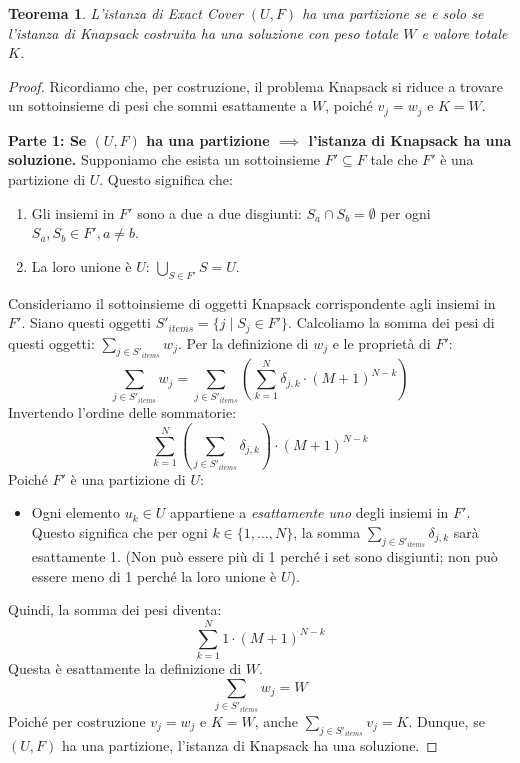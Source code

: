 \documentclass[a4paper, 11pt]{book} %
\newtheorem{theorem}{Teorema}[section]
\theoremstyle{definition}
\begin{document}
\begin{theorem}
L'istanza di Exact Cover $(U, F)$ ha una partizione se e solo se l'istanza di Knapsack costruita ha una soluzione con peso totale $W$ e valore totale $K$.
\end{theorem}
\begin{proof}
Ricordiamo che, per costruzione, il problema Knapsack si riduce a trovare un sottoinsieme di pesi che sommi esattamente a $W$, poiché $v_j=w_j$ e $K=W$.

\textbf{Parte 1: Se $(U, F)$ ha una partizione $\implies$ l'istanza di Knapsack ha una soluzione.}
Supponiamo che esista un sottoinsieme $F' \subseteq F$ tale che $F'$ è una partizione di $U$. Questo significa che:
\begin{enumerate}
    \item Gli insiemi in $F'$ sono a due a due disgiunti: $S_a \cap S_b = \emptyset$ per ogni $S_a, S_b \in F', a \neq b$.
    \item La loro unione è $U$: $\bigcup_{S \in F'} S = U$.
\end{enumerate}
Consideriamo il sottoinsieme di oggetti Knapsack corrispondente agli insiemi in $F'$. Siano questi oggetti $S'_{items} = \{j \mid S_j \in F'\}$.
Calcoliamo la somma dei pesi di questi oggetti: $\sum_{j \in S'_{items}} w_j$.
Per la definizione di $w_j$ e le proprietà di $F'$:
\[ \sum_{j \in S'_{items}} w_j = \sum_{j \in S'_{items}} \left( \sum_{k=1}^N \delta_{j,k} \cdot (M+1)^{N-k} \right) \]
Invertendo l'ordine delle sommatorie:
\[ \sum_{k=1}^N \left( \sum_{j \in S'_{items}} \delta_{j,k} \right) \cdot (M+1)^{N-k} \]
Poiché $F'$ è una partizione di $U$:
\begin{itemize}
    \item Ogni elemento $u_k \in U$ appartiene a \emph{esattamente uno} degli insiemi in $F'$. Questo significa che per ogni $k \in \{1, \ldots, N\}$, la somma $\sum_{j \in S'_{items}} \delta_{j,k}$ sarà esattamente 1. (Non può essere più di 1 perché i set sono disgiunti; non può essere meno di 1 perché la loro unione è $U$).
\end{itemize}
Quindi, la somma dei pesi diventa:
\[ \sum_{k=1}^N 1 \cdot (M+1)^{N-k} \]
Questa è esattamente la definizione di $W$.
\[ \sum_{j \in S'_{items}} w_j = W \]
Poiché per costruzione $v_j=w_j$ e $K=W$, anche $\sum_{j \in S'_{items}} v_j = K$.
Dunque, se $(U, F)$ ha una partizione, l'istanza di Knapsack ha una soluzione.


\end{proof}
\end{document}
